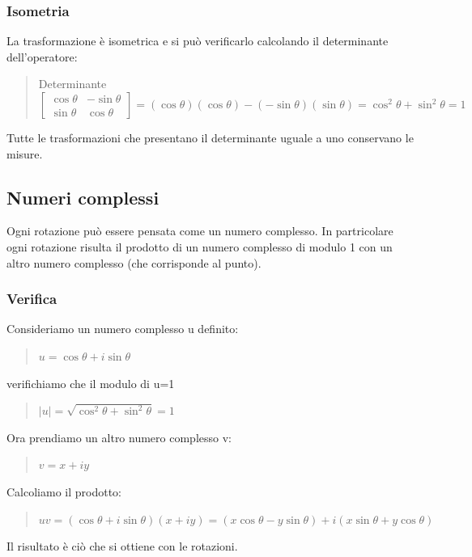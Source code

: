 \documentclass[a4paper]{article}
\begin{document}
\subsubsection{Isometria}
La trasformazione è isometrica e si può verificarlo calcolando il determinante dell'operatore:
\begin{quote} \centering Determinante$\left[\begin{matrix}\cos\theta & -\sin\theta\\ \sin\theta & \cos\theta\end{matrix}\right]= (\cos\theta)(\cos\theta)-(-\sin\theta)(\sin\theta)= \cos^2\theta+\sin^2\theta=1
$\end{quote}
Tutte le trasformazioni che presentano il determinante uguale a uno conservano le misure.
\subsection{Numeri complessi}
Ogni rotazione può essere pensata come un numero complesso. In partricolare ogni rotazione risulta il prodotto di un numero complesso di modulo 1 con un altro numero complesso (che corrisponde al punto).
\subsubsection{Verifica}
Consideriamo un numero complesso u definito:
\begin{quote} \centering $u=\cos\theta+\textit{i}\sin\theta
$\end{quote}
verifichiamo che il modulo di u=1
\begin{quote} \centering$ |u|=\sqrt{\cos^2\theta+\sin^2\theta}=1
$\end{quote}
Ora prendiamo un altro numero complesso v:
\begin{quote} \centering$v=x+\textit{i}y 
$\end{quote}
Calcoliamo il prodotto:
\begin{quote} \centering$uv=(\cos\theta+\textit{i}\sin\theta)(x+\textit{i}y)=(x\cos\theta-y\sin\theta)+\textit{i}(x\sin\theta+y\cos\theta)
$\end{quote}
Il risultato è ciò che si ottiene con le rotazioni.
\end{document}
